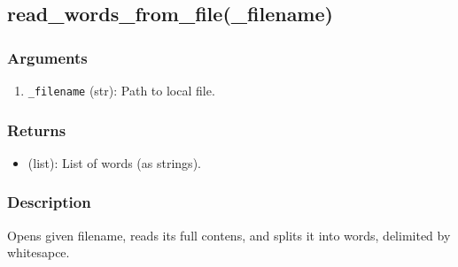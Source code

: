 \subsection{read\_words\_from\_file(\_filename)}
\subsubsection*{Arguments}
\begin{enumerate}
    \item \texttt{\_filename} (str): Path to local file.
\end{enumerate}
\subsubsection*{Returns}
\begin{itemize}
    \item (list): List of words (as strings).
\end{itemize}
\subsubsection*{Description}
Opens given filename, reads its full contens, and splits it into words, delimited by whitesapce.